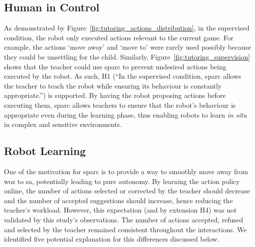 
\subsection{Human in Control}\label{sec:tuto_control}

As demonstrated by Figure~\ref{fig:tutoring_actions_distribution}, in the supervised condition, the robot only executed actions relevant to the current game. For example, the actions `move away' and `move to' were rarely used possibly because they could be unsettling for the child. Similarly, Figure~\ref{fig:tutoring_supervision} shows that the teacher could use \gls{sparc} to prevent undesired actions being executed by the robot. As such, H1 (``In the supervised condition, \gls{sparc} allows the teacher to teach the robot while ensuring its behaviour is constantly appropriate.'') is supported. By having the robot proposing actions before executing them, \gls{sparc} allows teachers to ensure that the robot's behaviour is appropriate even during the learning phase, thus enabling robots to learn \emph{in situ} in complex and sensitive environments.

\subsection{Robot Learning} \label{sec:tutoring_disc_learning}

One of the motivation for \gls{sparc} is to provide a way to smoothly move away from \gls{woz} to \gls{sa}, potentially leading to pure autonomy. By learning the action policy online, the number of actions selected or corrected by the teacher should decrease and the number of accepted suggestions should increase, hence reducing the teacher's workload. However, this expectation (and by extension H4) was not validated by this study's observations. The number of actions accepted, refused and selected by the teacher remained consistent throughout the interactions. We identified five potential explanation for this differences discussed below.

